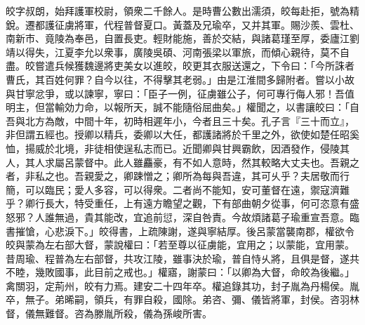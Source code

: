 
\begin{pinyinscope}
皎字叔朗，始拜護軍校尉，領衆二千餘人。是時曹公數出濡須，皎每赴拒，號為精銳。遷都護征虜將軍，代程普督夏口。黃蓋及兄瑜卒，又并其軍。賜沙羨、雲杜、南新市、竟陵為奉邑，自置長吏。輕財能施，善於交結，與諸葛瑾至厚，委廬江劉靖以得失，江夏李允以衆事，廣陵吳碩、河南張梁以軍旅，而傾心親待，莫不自盡。皎嘗遣兵候獲魏邊將吏美女以進皎，皎更其衣服送還之，下令曰：「今所誅者曹氏，其百姓何罪？自今以往，不得擊其老弱。」由是江淮間多歸附者。嘗以小故與甘寧忿爭，或以諫寧，寧曰：「臣子一例，征虜雖公子，何可專行侮人邪！吾值明主，但當輸効力命，以報所天，誠不能隨俗屈曲矣。」權聞之，以書讓皎曰：「自吾與北方為敵，中間十年，初時相遲年小，今者且三十矣。孔子言『三十而立』，非但謂五經也。授卿以精兵，委卿以大任，都護諸將於千里之外，欲使如楚任昭奚恤，揚威於北境，非徒相使逞私志而已。近聞卿與甘興霸飲，因酒發作，侵陵其人，其人求屬呂蒙督中。此人雖麤豪，有不如人意時，然其較略大丈夫也。吾親之者，非私之也。吾親愛之，卿踈憎之；卿所為每與吾違，其可乆乎？夫居敬而行簡，可以臨民；愛人多容，可以得衆。二者尚不能知，安可董督在遠，禦寇濟難乎？卿行長大，特受重任，上有遠方瞻望之觀，下有部曲朝夕從事，何可恣意有盛怒邪？人誰無過，貴其能改，宜追前愆，深自咎責。今故煩諸葛子瑜重宣吾意。臨書摧愴，心悲淚下。」皎得書，上疏陳謝，遂與寧結厚。後呂蒙當襲南郡，權欲令皎與蒙為左右部大督，蒙說權曰：「若至尊以征虜能，宜用之；以蒙能，宜用蒙。昔周瑜、程普為左右部督，共攻江陵，雖事決於瑜，普自恃乆將，且俱是督，遂共不睦，幾敗國事，此目前之戒也。」權寤，謝蒙曰：「以卿為大督，命皎為後繼。」禽關羽，定荊州，皎有力焉。建安二十四年卒。權追錄其功，封子胤為丹楊侯。胤卒，無子。弟晞嗣，領兵，有罪自殺，國除。弟咨、彌、儀皆將軍，封侯。咨羽林督，儀無難督。咨為滕胤所殺，儀為孫峻所害。


\end{pinyinscope}